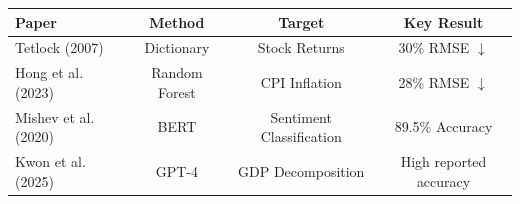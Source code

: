 \documentclass[preview]{standalone}
\begin{document}
\begin{tabular}{|l|c|c|c|}
\hline
\textbf{Paper} & \textbf{Method} & \textbf{Target} & \textbf{Key Result} \\
\hline
Tetlock (2007) & Dictionary & Stock Returns & 30\% RMSE $\downarrow$ \\
Hong et al. (2023) & Random Forest & CPI Inflation & 28\% RMSE $\downarrow$ \\
Mishev et al. (2020) & BERT & Sentiment Classification & 89.5\% Accuracy \\
Kwon et al. (2025) & GPT-4 & GDP Decomposition & High reported accuracy \\
\hline
\end{tabular}
\end{document}
